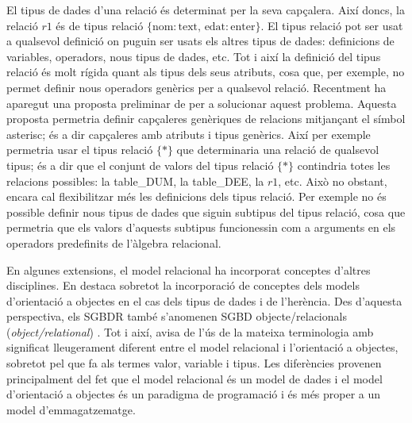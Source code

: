 El tipus de dades d'una relació és determinat per la seva capçalera.
Així doncs, la relació $r1$ és de tipus relació $\{\text{nom}:
\text{text},\, \text{edat}:\text{enter} \}$.  El tipus relació pot ser
usat a qualsevol definició on puguin ser usats els altres tipus de
dades: definicions de variables, operadors, nous tipus de dades,
etc. Tot i així la definició del tipus relació és molt rígida quant
als tipus dels seus atributs, cosa que, per exemple, no permet definir
nous operadors genèrics per a qualsevol relació.  Recentment ha
aparegut una proposta preliminar de
\textcite{darwen13:generic_relation_type} per a solucionar aquest
problema. Aquesta proposta permetria definir capçaleres genèriques de
relacions mitjançant el símbol asterisc; és a dir capçaleres amb
atributs i tipus genèrics. Així per exemple permetria usar el tipus
relació $\{ * \}$ que determinaria una relació de qualsevol tipus; és
a dir que el conjunt de valors del tipus relació $\{ * \}$ contindria
totes les relacions possibles: la table\_DUM, la table\_DEE, la $r1$,
etc. Això no obstant, encara cal flexibilitzar més les definicions
dels tipus relació. Per exemple no és possible definir nous tipus de
dades que siguin subtipus del tipus relació, cosa que permetria que
els valors d'aquests subtipus funcionessin com a arguments en els
operadors predefinits de l'àlgebra relacional.




En algunes extensions, el model relacional ha incorporat conceptes
d'altres disciplines. En destaca sobretot la incorporació de conceptes
dels models d'orientació a objectes en el cas dels tipus de dades i de
l'herència.  Des d'aquesta perspectiva, els \gls{SGBDR} també s'anomenen
\gls{SGBD} objecte/relacionals (\emph{object/relational})
\parencite{date02:foundation}.  Tot i així, \textcite[cap.~6]{date06}
avisa de l'ús de la mateixa terminologia amb significat lleugerament
diferent entre el model relacional i l'orientació a objectes, sobretot
pel que fa als termes valor, variable i tipus. %
Les diferències provenen principalment del fet que el model relacional
és un model de dades i el model d'orientació a objectes és un
paradigma de programació i és més proper a un model d'emmagatzematge.






